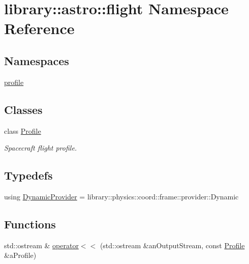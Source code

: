 \hypertarget{namespacelibrary_1_1astro_1_1flight}{}\section{library\+:\+:astro\+:\+:flight Namespace Reference}
\label{namespacelibrary_1_1astro_1_1flight}
\subsection*{Namespaces}
\begin{DoxyCompactItemize}
\item 
 \hyperlink{namespacelibrary_1_1astro_1_1flight_1_1profile}{profile}
\end{DoxyCompactItemize}
\subsection*{Classes}
\begin{DoxyCompactItemize}
\item 
class \hyperlink{classlibrary_1_1astro_1_1flight_1_1_profile}{Profile}
\begin{DoxyCompactList}\small\item\em Spacecraft flight profile. \end{DoxyCompactList}\end{DoxyCompactItemize}
\subsection*{Typedefs}
\begin{DoxyCompactItemize}
\item 
using \hyperlink{namespacelibrary_1_1astro_1_1flight_abb1675a9d237997a3e5c7f343ce8dbc8}{Dynamic\+Provider} = library\+::physics\+::coord\+::frame\+::provider\+::\+Dynamic
\end{DoxyCompactItemize}
\subsection*{Functions}
\begin{DoxyCompactItemize}
\item 
std\+::ostream \& \hyperlink{namespacelibrary_1_1astro_1_1flight_a4243a9a8bd3098203443db5a4227bc01}{operator$<$$<$} (std\+::ostream \&an\+Output\+Stream, const \hyperlink{classlibrary_1_1astro_1_1flight_1_1_profile}{Profile} \&a\+Profile)
\end{DoxyCompactItemize}



